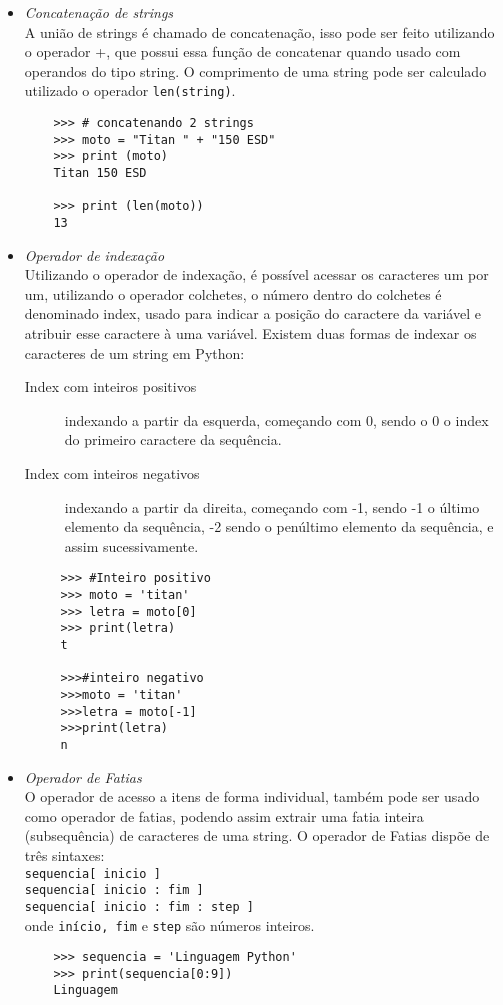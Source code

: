     \begin{itemize}
      \item \textit{Concatenação de strings}\\
            A união de strings é chamado de concatenação, isso pode ser feito utilizando o operador +, que possui essa função de concatenar quando usado com operandos do tipo string. O comprimento de uma string pode ser calculado utilizado o operador \texttt{len(string)}.
     \begin{lstlisting}
    >>> # concatenando 2 strings
    >>> moto = "Titan " + "150 ESD"
    >>> print (moto)
    Titan 150 ESD
    
    >>> print (len(moto))
    13
    \end{lstlisting}

      \item \textit{Operador de indexação}\\
      Utilizando o operador de indexação, é possível acessar os caracteres um por um, utilizando o operador colchetes, o número dentro do colchetes é denominado index, usado para indicar a posição do caractere da variável e atribuir esse caractere à uma variável.
      Existem duas formas de indexar os caracteres de um string em Python:\\
      \begin{description}
        \item[Index com inteiros positivos] indexando a partir da esquerda, começando com 0, sendo o 0 o index do primeiro caractere da sequência.
        \item[Index com inteiros negativos] indexando a partir da direita, começando com -1, sendo -1 o último elemento da sequência, -2 sendo o penúltimo elemento da sequência, e assim sucessivamente.
      \end{description}

     \begin{lstlisting}
     >>> #Inteiro positivo
     >>> moto = 'titan'
     >>> letra = moto[0]
     >>> print(letra)
     t
     
     >>>#inteiro negativo
     >>>moto = 'titan'
     >>>letra = moto[-1]
     >>>print(letra)
     n
        \end{lstlisting}


      \item \textit{Operador de Fatias}\\
      O operador de acesso a itens de forma individual, também pode ser usado como operador de fatias, podendo assim extrair uma fatia inteira (subsequência) de caracteres de uma string. O operador de Fatias dispõe de três sintaxes:\\
      \texttt{sequencia[ inicio ]}\\
      \texttt{sequencia[ inicio : fim ]} \\
      \texttt{sequencia[ inicio : fim : step ]}\\
      onde \texttt{início, fim} e \texttt{step} são números inteiros.
     \begin{lstlisting}
    >>> sequencia = 'Linguagem Python'
    >>> print(sequencia[0:9])
    Linguagem
    

\end{lstlisting}
\end{itemize}
